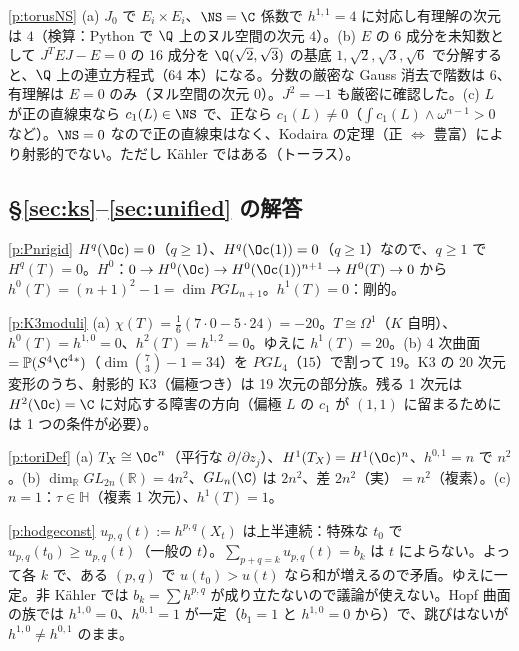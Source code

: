 \begin{sol}{\ref{p:torusNS}}
(a) $J_0$ で $E_i\times E_i$、$\NS=\C$ 係数で $h^{1,1}=4$ に対応し有理解の次元は $4$（検算：Python で $\Q$ 上のヌル空間の次元 $4$）。(b) $E$ の 6 成分を未知数として $J^TEJ-E=0$ の 16 成分を $\Q(\sqrt2,\sqrt3)$ の基底 $1,\sqrt2,\sqrt3,\sqrt6$ で分解すると、$\Q$ 上の連立方程式（64 本）になる。分数の厳密な Gauss 消去で階数は $6$、有理解は $E=0$ のみ（ヌル空間の次元 $0$）。$J^2=-1$ も厳密に確認した。(c) $L$ が正の直線束なら $c_1(L)\in\NS$ で、正なら $c_1(L)\ne0$（$\int c_1(L)\wedge\omega^{n-1}>0$ など）。$\NS=0$ なので正の直線束はなく、Kodaira の定理（正 $\iff$ 豊富）により射影的でない。ただし Kähler ではある（トーラス）。
\end{sol}

\subsection*{\S\ref{sec:ks}--\ref{sec:unified} の解答}
\begin{sol}{\ref{p:Pnrigid}}
$H^q(\Oc)=0$（$q\ge1$）、$H^q(\Oc(1))=0$（$q\ge1$）なので、$q\ge1$ で $H^q(T)=0$。$H^0$：$0\to H^0(\Oc)\to H^0(\Oc(1))^{n+1}\to H^0(T)\to0$ から $h^0(T)=(n+1)^2-1=\dim PGL_{n+1}$。$h^1(T)=0$：剛的。
\end{sol}
\begin{sol}{\ref{p:K3moduli}}
(a) $\chi(T)=\frac16(7\cdot0-5\cdot24)=-20$。$T\cong\Omega^1$（$K$ 自明）、$h^0(T)=h^{1,0}=0$、$h^2(T)=h^{1,2}=0$。ゆえに $h^1(T)=20$。(b) 4 次曲面 $=\mathbb P(S^4\C^4{}^*)$（$\dim\binom73-1=34$）を $PGL_4$（$15$）で割って $19$。K3 の 20 次元変形のうち、射影的 K3（偏極つき）は 19 次元の部分族。残る 1 次元は $H^2(\Oc)=\C$ に対応する障害の方向（偏極 $L$ の $c_1$ が $(1,1)$ に留まるためには 1 つの条件が必要）。
\end{sol}
\begin{sol}{\ref{p:toriDef}}
(a) $T_X\cong\Oc^n$（平行な $\partial/\partial z_j$）、$H^1(T_X)=H^1(\Oc)^n$、$h^{0,1}=n$ で $n^2$。(b) $\dim_{\mathbb R}GL_{2n}(\mathbb R)=4n^2$、$GL_n(\C)$ は $2n^2$、差 $2n^2$（実）$=n^2$（複素）。(c) $n=1$：$\tau\in\mathbb H$（複素 1 次元）、$h^1(T)=1$。
\end{sol}
\begin{sol}{\ref{p:hodgeconst}}
$u_{p,q}(t):=h^{p,q}(X_t)$ は上半連続：特殊な $t_0$ で $u_{p,q}(t_0)\ge u_{p,q}(t)$（一般の $t$）。$\sum_{p+q=k}u_{p,q}(t)=b_k$ は $t$ によらない。よって各 $k$ で、ある $(p,q)$ で $u(t_0)>u(t)$ なら和が増えるので矛盾。ゆえに一定。非 Kähler では $b_k=\sum h^{p,q}$ が成り立たないので議論が使えない。Hopf 曲面の族では $h^{1,0}=0$、$h^{0,1}=1$ が一定（$b_1=1$ と $h^{1,0}=0$ から）で、跳びはないが $h^{1,0}\ne h^{0,1}$ のまま。
\end{sol}
